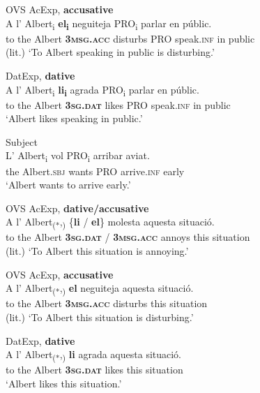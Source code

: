 \documentclass[output=paper,colorlinks,citecolor=brown,modfonts,nonflat]{langsci/langscibook}
\begin{document}
{{ \ex OVS AcExp, \textbf{accusative}\label{ex:royo:12b}\\
 \gll A l’ Albert\textsubscript{i} \textbf{el\textsubscript{i}} neguiteja PRO\textsubscript{i} parlar en públic.\\
  to the Albert \textbf{\textsc{3msg.acc}} disturbs PRO speak.\textsc{inf} in public\\
\glt (lit.) ‘To Albert speaking in public is disturbing.’

 \ex DatExp, \textbf{dative}\label{ex:royo:12c}\\
 \gll A l’ Albert\textsubscript{i} \textbf{li\textsubscript{i}} agrada PRO\textsubscript{i} parlar en públic.\\
 to the Albert \textbf{\textsc{3sg.dat}} likes PRO speak.\textsc{inf} in public\\
\glt ‘Albert likes speaking in public.’

 \ex Subject\label{ex:royo:12d}\\
 \gll L’ Albert\textsubscript{i} vol PRO\textsubscript{i} arribar aviat.\\
 the Albert.\textsc{sbj} wants PRO arrive.\textsc{inf} early\\
\glt ‘Albert wants to arrive early.’

 \z
 \z



\ea%
 \label{ex:royo:13}
 \ea OVS AcExp, \textbf{dative/accusative}\label{ex:royo:13a}\\
 \gll A l’ Albert\textsubscript{(*},\textsubscript{)} \{\textbf{li} / \textbf{el}\} molesta aquesta situació.\\
 to the Albert \textbf{\textsc{3sg.dat}} / \textbf{\textsc{3msg.acc}} annoys this situation\\
\glt (lit.) ‘To Albert this situation is annoying.’

 \ex OVS AcExp, \textbf{accusative}\label{ex:royo:13b}\\
 \gll A l’ Albert\textsubscript{(*},\textsubscript{)} \textbf{el} neguiteja aquesta situació.\\
 to the Albert \textbf{\textsc{3msg.acc}} disturbs this situation \\
\glt (lit.) ‘To Albert this situation is disturbing.’

 \ex DatExp, \textbf{dative}\label{ex:royo:13c}\\
 \gll A l’ Albert\textsubscript{(*},\textsubscript{)} \textbf{li} agrada aquesta situació.\\
 to the Albert \textbf{\textsc{3sg.dat}} likes this situation\\
\glt ‘Albert likes this situation.’

}}
\end{document}
